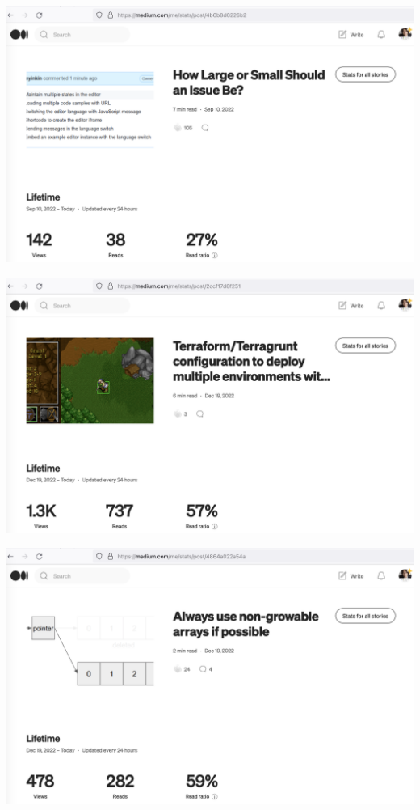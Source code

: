 \begin{center}
    \includegraphics[width=\textwidth]{2022-09-10_2_issue}
\end{center}

\begin{center}
    \includegraphics[width=\textwidth]{2022-12-19_1_terragrunt}
\end{center}

\begin{center}
    \includegraphics[width=\textwidth]{2022-12-19_2_arrays}
\end{center}

